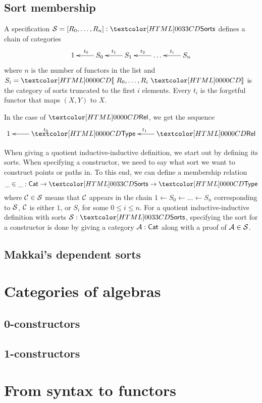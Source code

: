 \subsection{Sort membership}

A specification $\Ss = [R_0, \ldots, R_n] : \sortsty$ defines a chain of categories
\[
\xymatrix{
1 &S_0 \ar[l]_{t_0} &S_1 \ar[l]_{t_1} &\hdots \ar[l]_{t_2} &S_n \ar[l]_{t_i}
}
\]
where $n$ is the number of functors in the list and
$S_i = \SortCat{R_0, \ldots, R_i}$ is the category of sorts truncated
to the first $i$ elements. Every $t_i$ is the forgetful functor that
maps $(X,Y)$ to $X$.

\begin{example}
In the case of $\Rel$, we get the sequence
\[
\xymatrix{
1 &\Type \ar[l]_{t_0} &\Rel \ar[l]_{t_1}
}
\]
\end{example}

When giving a quotient inductive-inductive definition, we start out by
defining its sorts. When specifying a constructor, we need to say what
sort we want to construct points or paths in. To this end, we can
define a membership relation
\[
  \_ \in \_ : \Cat \to \sortsty \to \Type
\]
where $\mathcal{C} \in \mathcal{S}$ means that $\mathcal{C}$ appears in the chain
${1 \leftarrow S_0 \leftarrow \ldots \leftarrow S_n}$ corresponding to
$\mathcal{S}$, \ie $\mathcal{C}$ is either $1$, or $S_i$ for some $0 \leq i \leq
n$.
For a quotient inductive-inductive definition with sorts
$\Ss : \sortsty$, specifying the sort for a constructor is done by
giving a category $\mathcal{A} : \mathsf{Cat}$ along with a proof of $\mathcal{A} \in \mathcal{S}$.

\subsection{Makkai's dependent sorts}

\section{Categories of algebras}

\subsection{0-constructors}

\subsection{1-constructors}


\section{From syntax to functors}

